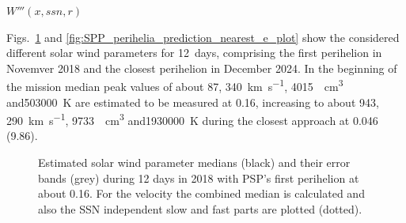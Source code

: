 $W'''(x,ssn,r)$

Figs.~\ref{fig:SPP_perihelia_prediction_e_plot} and \ref{fig:SPP_perihelia_prediction_nearest_e_plot} show the considered different solar wind parameters for 12~days, comprising the first perihelion in Novemver 2018 and the closest perihelion in December 2024. In the beginning of the mission median peak values of about  \SI{87}{\nT}, \SI{340}{\km\per\s}, \SI{4015}{\per\cm\cubed} and\SI{503000}{\K} are estimated to be measured at \SI{0.16}{\au}, increasing to about \SI{943}{\nT}, \SI{290}{\km\per\s}, \SI{9733}{\per\cm\cubed} and\SI{1930000}{\K} during the closest approach at \SI{0.046}{\au} (\SI{9.86}{\Rs}).
\begin{figure}
	\caption{Estimated solar wind parameter medians (black) and their error bands (grey) during 12 days in 2018 with PSP's first perihelion at about \SI{0.16}{\au}. For the velocity the combined median is calculated and also the SSN independent slow and fast parts are plotted (dotted).}
	\label{fig:SPP_perihelia_prediction_e_plot}
\end{figure}

